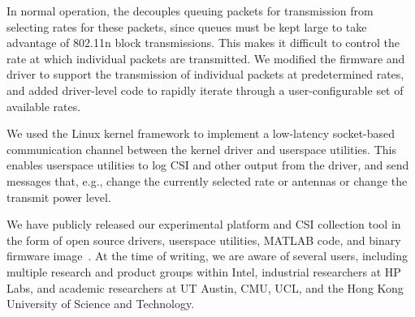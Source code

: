  In normal operation, the  decouples queuing packets for transmission from selecting rates for these packets, since queues must be kept large to take advantage of 802.11n block transmissions. This makes it difficult to control the rate at which individual packets are transmitted. We modified the firmware and driver to support the transmission of individual packets at predetermined rates, and added driver-level code to rapidly iterate through a user-configurable set of available rates.

 We used the Linux kernel  framework to implement a low-latency socket-based communication channel between the kernel driver and userspace utilities. This enables userspace utilities to log CSI and other output from the driver, and send messages that, e.g., change the currently selected rate or antennas or change the transmit power level.

 We have publicly released our experimental platform and CSI collection tool in the form of open source drivers, userspace utilities, MATLAB code, and binary firmware image~\cite{Halperin_csitool}. At the time of writing, we are aware of several users, including multiple research and product groups within Intel, industrial researchers at HP Labs, and academic researchers at UT Austin, CMU, UCL, and the Hong Kong University of Science and Technology.

\ifx\mainfile\undefined

\fi